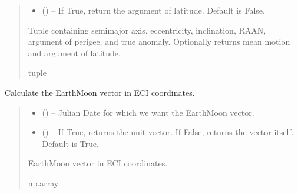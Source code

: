 \documentclass[letterpaper,10pt,english]{sphinxmanual}
\begin{document}
\begin{fulllineitems}
\begin{quote}
\begin{description}
\begin{itemize}
\item {} 
\sphinxAtStartPar
{} () – If True, return the argument of latitude. Default is False.

\end{itemize}

\sphinxAtStartPar
Tuple containing semi\sphinxhyphen{}major axis, eccentricity, inclination,
RAAN, argument of perigee, and true anomaly. Optionally returns
mean motion and argument of latitude.

\sphinxAtStartPar
tuple

\end{description}\end{quote}

\end{fulllineitems}


\begin{fulllineitems}
\label{\detokenize{fspsim.utils:fspsim.utils.Conversions.earth_moon_vec}}
\pysigstartsignatures
{}
\pysigstopsignatures
\sphinxAtStartPar
Calculate the Earth\sphinxhyphen{}Moon vector in ECI coordinates.
\begin{quote}\begin{description}
\begin{itemize}
\item {} 
\sphinxAtStartPar
{} () – Julian Date for which we want the Earth\sphinxhyphen{}Moon vector.

\item {} 
\sphinxAtStartPar
{} () – If True, returns the unit vector. If False, returns the vector itself. Default is True.

\end{itemize}

\sphinxAtStartPar
Earth\sphinxhyphen{}Moon vector in ECI coordinates.

\sphinxAtStartPar
np.array

\end{description}\end{quote}

\end{fulllineitems}
\end{document}
